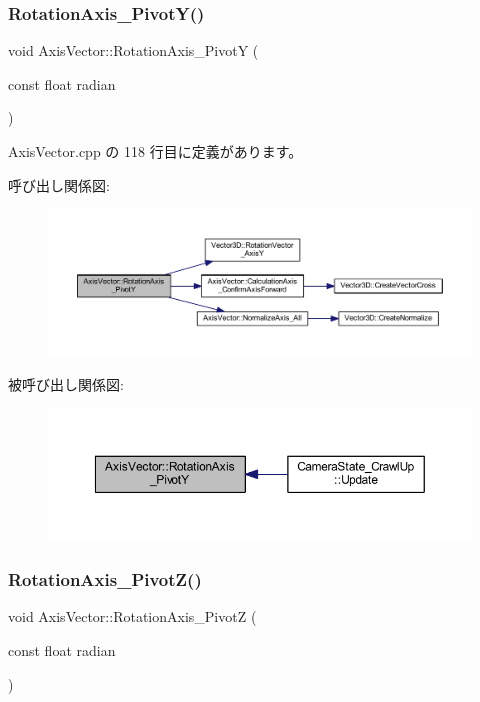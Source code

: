 \subsubsection{\texorpdfstring{Rotation\+Axis\+\_\+\+Pivot\+Y()}{RotationAxis\_PivotY()}}
{\footnotesize\ttfamily void Axis\+Vector\+::\+Rotation\+Axis\+\_\+\+PivotY (\begin{DoxyParamCaption}\item[{const float}]{radian }\end{DoxyParamCaption})}



 Axis\+Vector.\+cpp の 118 行目に定義があります。

呼び出し関係図\+:
\nopagebreak
\begin{figure}[H]
\begin{center}
\leavevmode
\includegraphics[width=350pt]{class_axis_vector_aee4198c9fcf78d6912b129e2210a58fa_cgraph}
\end{center}
\end{figure}
被呼び出し関係図\+:
\nopagebreak
\begin{figure}[H]
\begin{center}
\leavevmode
\includegraphics[width=350pt]{class_axis_vector_aee4198c9fcf78d6912b129e2210a58fa_icgraph}
\end{center}
\end{figure}
\mbox{\label{class_axis_vector_adde5b636a046a4fe6c5c943646045843}} 
\subsubsection{\texorpdfstring{Rotation\+Axis\+\_\+\+Pivot\+Z()}{RotationAxis\_PivotZ()}}
{\footnotesize\ttfamily void Axis\+Vector\+::\+Rotation\+Axis\+\_\+\+PivotZ (\begin{DoxyParamCaption}\item[{const float}]{radian }\end{DoxyParamCaption})}



